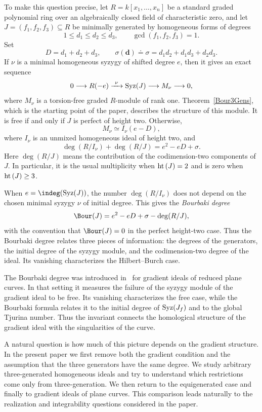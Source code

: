 \documentclass[11pt]{amsart} %
\newcommand{\lar}{\longrightarrow}
\theoremstyle{definition}
\def\hht{{\rm ht}\,}
\def\syz{\mbox{\rm Syz}}
\def\hht{{\rm ht}\,}
\begin{document}
To make this question precise, let $R=k[x_1,\ldots,x_n]$ be a standard graded polynomial ring over an algebraically closed field of characteristic zero, and let $J=(f_1,f_2,f_3)\subseteq R$ be minimally generated by homogeneous forms
of degrees
\[
1\le d_1\le d_2\le d_3,
\qquad
\gcd(f_1,f_2,f_3)=1.
\]
Set
\[
D=d_1+d_2+d_3,
\qquad
\sigma(\textbf{d}) \doteq \sigma=d_1d_2+d_1d_3+d_2d_3.
\]
If $\nu$ is a minimal homogeneous syzygy of shifted degree $e$, then it
gives an exact sequence
\[
0\lar R(-e)\xrightarrow{\ \nu\ }\syz(J)\lar M_\nu\lar0,
\]
where $M_\nu$ is a torsion-free graded $R$-module of rank one. Theorem~\ref{Bour3Gens}, which is the starting point of the
paper, describes the structure of this module. It is free if and only
if $J$ is perfect of height two. Otherwise,
\[
M_\nu\simeq I_\nu(e-D),
\]
where $I_\nu$ is an unmixed homogeneous ideal of height two, and
\[
\deg(R/I_\nu)+\deg(R/J)=e^2-eD+\sigma.
\]
Here $\deg(R/J)$ means the contribution of the codimension-two
components of $J$. In particular, it is the usual multiplicity when
$\hht(J)=2$ and is zero when $\hht(J)\ge3$.

When $e=\indeg(\syz(J))$, the number $\deg(R/I_\nu)$ does not depend on
the chosen minimal syzygy $\nu$ of initial degree. This gives the
\emph{Bourbaki degree}
\[
\Bour(J)=e^2-eD+\sigma-\deg(R/J),
\]
with the convention that $\Bour(J)=0$ in the perfect height-two case.
Thus the Bourbaki degree relates three pieces of information: the
degrees of the generators, the initial degree of the syzygy module,
and the codimension-two degree of the ideal. Its vanishing characterizes
the Hilbert--Burch case.

The Bourbaki degree was introduced in~\cite{MAA} for gradient ideals of
reduced plane curves. In that setting it measures the failure of the
syzygy module of the gradient ideal to be free. Its vanishing
characterizes the free case, while the Bourbaki formula relates it to
the initial degree of $\syz(J_f)$ and to the global Tjurina number.
Thus the invariant connects the homological structure of the gradient
ideal with the singularities of the curve.

A natural question is how much of this picture depends on the gradient
structure. In the present paper we first remove both the gradient
condition and the assumption that the three generators have the same
degree. We study arbitrary three-generated homogeneous ideals and try
to understand which restrictions come only from three-generation.
We then return to the equigenerated case and finally to gradient ideals
of plane curves. This comparison leads naturally to the realization
and integrability questions considered in the paper.
\end{document}
